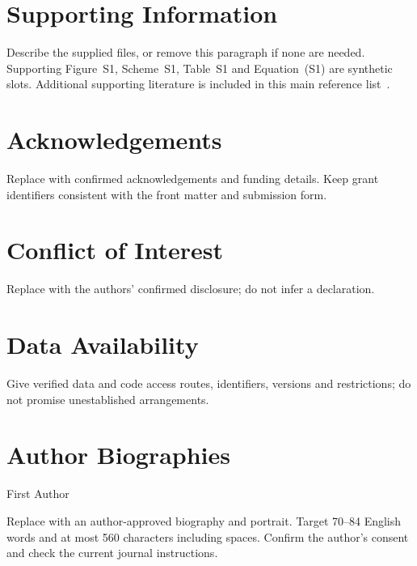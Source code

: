 \documentclass[serif,twocolumn]{prism-wiley-article}
\begin{document}
\section*{Supporting Information}
Describe the supplied files, or remove this paragraph if none are needed.
Supporting Figure~S1, Scheme~S1, Table~S1 and Equation~(S1) are synthetic
slots. Additional supporting literature is included in this main reference
list~\cite{peng2011reproducible}.

\section*{Acknowledgements}
Replace with confirmed acknowledgements and funding details. Keep grant
identifiers consistent with the front matter and submission form.

\section*{Conflict of Interest}
Replace with the authors' confirmed disclosure; do not infer a declaration.

\section*{Data Availability}
Give verified data and code access routes, identifiers, versions and
restrictions; do not promise unestablished arrangements.




\noindent\begin{minipage}{\linewidth}
\section*{Author Biographies}
\begin{biography}{First Author}
\par\smallskip
Replace with an author-approved biography and portrait. Target 70--84 English
words and at most 560 characters including spaces. Confirm the author's
consent and check the current journal instructions.
\end{biography}
\end{minipage}
\end{document}
